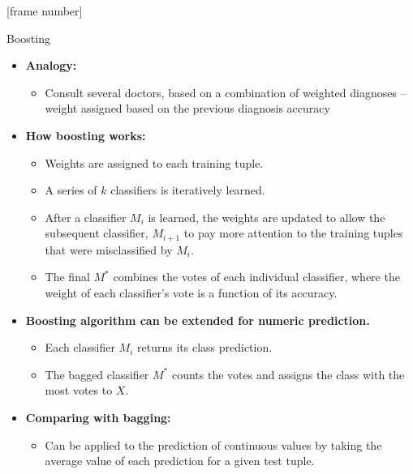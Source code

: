 \documentclass[aspectratio=169,t,table]{beamer}
\begin{document}
  {
    [frame number]
    \begin{frame}{Boosting}
      \begin{itemize}
        \item \textbf{Analogy:}
        \begin{itemize}
          \item Consult several doctors, based on a combination of weighted diagnoses -- weight assigned based on the previous diagnosis accuracy
        \end{itemize}
        \item \textbf{How boosting works:}
        \begin{itemize}
          \item Weights are assigned to each training tuple.
          \item A series of $k$ classifiers is iteratively learned.
          \item After a classifier $M_i$ is learned, the weights are updated to allow the subsequent classifier, $M_{i+1}$ to pay more attention to the training tuples that were misclassified by $M_i$.
          \item The final $M^*$ combines the votes of each individual classifier, where the weight of each classifier's vote is a function of its accuracy.
        \end{itemize}
        \item \textbf{Boosting algorithm can be extended for numeric prediction.}
        \begin{itemize}
          \item Each classifier $M_i$ returns its class prediction.
          \item The bagged classifier $M^*$ counts the votes and assigns the class with the most votes to $X$.
        \end{itemize}
        \item \textbf{Comparing with bagging:}
        \begin{itemize}
          \item Can be applied to the prediction of continuous values by taking the average value of each prediction for a given test tuple.
        \end{itemize}
      \end{itemize}
    \end{frame}
  }
\end{document}
